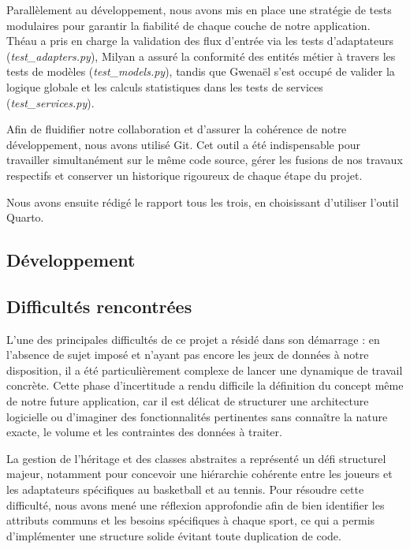 \documentclass[
  french,
  letterpaper,
  DIV=11,
  numbers=noendperiod]{scrartcl}
\begin{document}
Parallèlement au développement, nous avons mis en place une stratégie de
tests modulaires pour garantir la fiabilité de chaque couche de notre
application. Théau a pris en charge la validation des flux d'entrée via
les tests d'adaptateurs (\emph{test\_adapters.py}), Milyan a assuré la
conformité des entités métier à travers les tests de modèles
(\emph{test\_models.py}), tandis que Gwenaël s'est occupé de valider la
logique globale et les calculs statistiques dans les tests de services
(\emph{test\_services.py}).

Afin de fluidifier notre collaboration et d'assurer la cohérence de
notre développement, nous avons utilisé Git. Cet outil a été
indispensable pour travailler simultanément sur le même code source,
gérer les fusions de nos travaux respectifs et conserver un historique
rigoureux de chaque étape du projet.

Nous avons ensuite rédigé le rapport tous les trois, en choisissant
d'utiliser l'outil Quarto.

\subsection{Développement}\label{duxe9veloppement}

\subsection{Difficultés
rencontrées}\label{difficultuxe9s-rencontruxe9es}

L'une des principales difficultés de ce projet a résidé dans son
démarrage : en l'absence de sujet imposé et n'ayant pas encore les jeux
de données à notre disposition, il a été particulièrement complexe de
lancer une dynamique de travail concrète. Cette phase d'incertitude a
rendu difficile la définition du concept même de notre future
application, car il est délicat de structurer une architecture
logicielle ou d'imaginer des fonctionnalités pertinentes sans connaître
la nature exacte, le volume et les contraintes des données à traiter.

La gestion de l'héritage et des classes abstraites a représenté un défi
structurel majeur, notamment pour concevoir une hiérarchie cohérente
entre les joueurs et les adaptateurs spécifiques au basketball et au
tennis. Pour résoudre cette difficulté, nous avons mené une réflexion
approfondie afin de bien identifier les attributs communs et les besoins
spécifiques à chaque sport, ce qui a permis d'implémenter une structure
solide évitant toute duplication de code.
\end{document}
